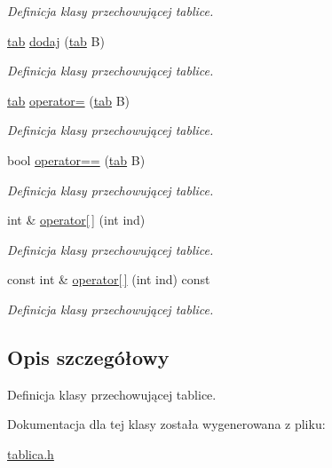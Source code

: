 \begin{DoxyCompactItemize}
\begin{DoxyCompactList}\small\item\em \-Definicja klasy przechowującej tablice. \end{DoxyCompactList}\item 
\hypertarget{classtab_a90dc8cfffe8244a6ae1218fd0444f399}{\hyperlink{classtab}{tab} \hyperlink{classtab_a90dc8cfffe8244a6ae1218fd0444f399}{dodaj} (\hyperlink{classtab}{tab} \-B)}\label{classtab_a90dc8cfffe8244a6ae1218fd0444f399}

\begin{DoxyCompactList}\small\item\em \-Definicja klasy przechowującej tablice. \end{DoxyCompactList}\item 
\hypertarget{classtab_a05351f5dbd8a13885d98b3165245e498}{\hyperlink{classtab}{tab} \hyperlink{classtab_a05351f5dbd8a13885d98b3165245e498}{operator=} (\hyperlink{classtab}{tab} \-B)}\label{classtab_a05351f5dbd8a13885d98b3165245e498}

\begin{DoxyCompactList}\small\item\em \-Definicja klasy przechowującej tablice. \end{DoxyCompactList}\item 
\hypertarget{classtab_a82eda0243a55cc93e412c46c1eef1b49}{bool \hyperlink{classtab_a82eda0243a55cc93e412c46c1eef1b49}{operator==} (\hyperlink{classtab}{tab} \-B)}\label{classtab_a82eda0243a55cc93e412c46c1eef1b49}

\begin{DoxyCompactList}\small\item\em \-Definicja klasy przechowującej tablice. \end{DoxyCompactList}\item 
\hypertarget{classtab_a3c549759a4a4870aa49c798c05915e2b}{int \& \hyperlink{classtab_a3c549759a4a4870aa49c798c05915e2b}{operator\mbox{[}$\,$\mbox{]}} (int ind)}\label{classtab_a3c549759a4a4870aa49c798c05915e2b}

\begin{DoxyCompactList}\small\item\em \-Definicja klasy przechowującej tablice. \end{DoxyCompactList}\item 
\hypertarget{classtab_aa0611573459a2dad5500d8315ef6fccc}{const int \& \hyperlink{classtab_aa0611573459a2dad5500d8315ef6fccc}{operator\mbox{[}$\,$\mbox{]}} (int ind) const }\label{classtab_aa0611573459a2dad5500d8315ef6fccc}

\begin{DoxyCompactList}\small\item\em \-Definicja klasy przechowującej tablice. \end{DoxyCompactList}\end{DoxyCompactItemize}


\subsection{\-Opis szczegółowy}
\-Definicja klasy przechowującej tablice. 

\-Dokumentacja dla tej klasy została wygenerowana z pliku\-:\begin{DoxyCompactItemize}
\item 
\hyperlink{tablica_8h}{tablica.\-h}\end{DoxyCompactItemize}
